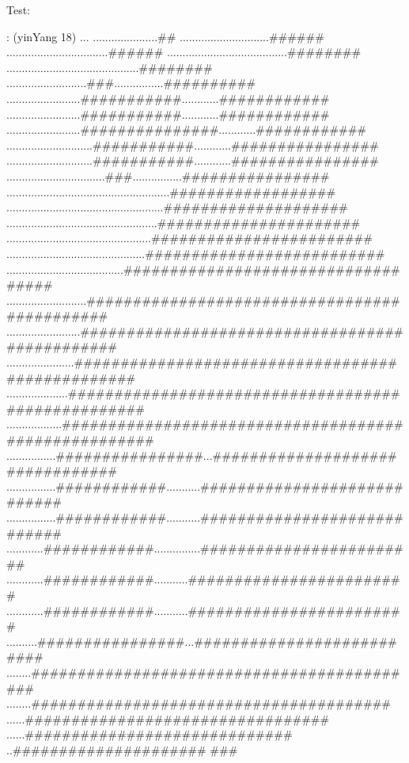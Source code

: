 \begin{wideverbatim}


Test:

: (yinYang 18)
                                   ...
                         .....................##
                   .............................######
                 .................................######
             .......................................########
           ...........................................########
         ..........................###................##########
       ........................###########............############
       ........................###########............############
     ........................###############............############
   ............................###########............################
   ............................###########............################
   ................................###................################
 .....................................................##################
 ...................................................####################
 .................................................######################
 ...............................................########################
 .............................................##########################
......................................###################################
 ..........................#############################################
 ........................###############################################
 ......................#################################################
 ....................###################################################
 ..................#####################################################
   ................################...################################
   ................############...........############################
   ................############...........############################
     ............############...............########################
       ............############...........########################
       ............############...........########################
         ..........################...##########################
           ........###########################################
             ........#######################################
                 ......#################################
                   ......#############################
                         ..#####################
                                   ###

\end{wideverbatim}



% 
